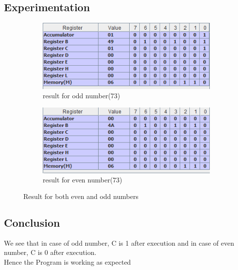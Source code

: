 \documentclass[a4paper]{article} %
\begin{document}
\subsection{Experimentation}
\begin{figure}[h!]
    \centering
    \begin{subfigure}[b]{0.49\linewidth}
        \centering
        \includegraphics[width=\linewidth]{Assignment 2/2_isodd/odd73.png}
        \caption{result for odd number(73)}
        \label{fg4a}
    \end{subfigure}
    \begin{subfigure}[b]{0.49\linewidth}
        \centering
        \includegraphics[width=\linewidth]{Assignment 2/2_isodd/even74.png}
        \caption{result for even number(73)}
        \label{fg4b}
    \end{subfigure}
    \caption{Result for both even and odd numbers}
    \label{fg4}
\end{figure}
\subsection{Conclusion}
We see that in case of odd number, C is 1 after execution and in case of even number, C is 0 after execution.\\
Hence the Program is working as expected
\newpage
\end{document}
